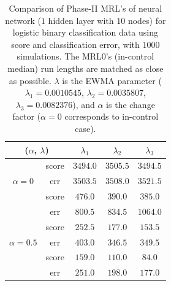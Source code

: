 \documentclass[twoside,11pt]{article}
\begin{document}
\begin{table}[!t]
\centering
\begin{tabular}{ccccc}
\toprule
\multicolumn{2}{c}{($ \alpha$, $ \lambda$)} & {$ \lambda_1$} & {$ \lambda_2$} & {$ \lambda_3$} \\
\midrule
\multirow{3}{*}{$\alpha=0$} & score &$3494.0$ & $3505.5$ & $3494.5$ \\
& err &$3503.5$ & $3508.0$ & $3521.5$ \\
\midrule
\multirow{3}{*}{$\alpha=0.3$} & score &$\bm{476.0}$ & $\bm{390.0}$ & $\bm{385.0}$ \\
& err &$800.5$ & $834.5$ & $1064.0$ \\
\midrule
\multirow{3}{*}{$\alpha=0.5$} & score &$\bm{252.5}$ & $\bm{177.0}$ & $\bm{153.5}$ \\
& err &$403.0$ & $346.5$ & $349.5$ \\
\midrule
\multirow{3}{*}{$\alpha=0.7$} & score &$\bm{159.0}$ & $\bm{110.0}$ & $\bm{84.0}$ \\
& err &$251.0$ & $198.0$ & $177.0$ \\
\midrule
\end{tabular}
\caption{Comparison of Phase-II MRL's of neural network ($1$ hidden layer with $10$ nodes) for logistic binary classification data using score and classification error, with $1000$ simulations. The MRL0's (in-control median) run lengths are matched as close as possible. $ \lambda$ is the EWMA parameter ({$ \lambda_1=0.0010545$}, {$ \lambda_2=0.0035807$}, {$ \lambda_3=0.0082376$}), and $ \alpha$ is the change factor ($ \alpha=0$ corresponds to in-control case).}
\label{tab:logi_nnet_MRL}
\end{table}
\end{document}
